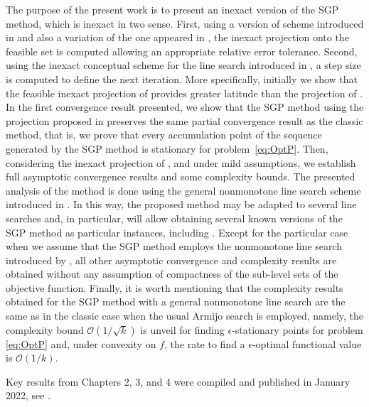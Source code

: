 The purpose of the present  work is to present an inexact version of the SGP method, which  is inexact in two sense. First,  using  a version of  scheme introduced in \cite{BirginMartinezRaydan2003} and also a variation of the one appeared in \cite[Example 1]{VillaSalzo2013},  the inexact projection  onto the feasible  set is computed  allowing an appropriate  relative error tolerance. Second,  using the inexact  conceptual scheme for the  line search  introduced  in  \cite{GrapigliaSachs2020, SachsSachs2011}, a step size is computed  to define the next iteration.   More specifically, initially we show that the  feasible inexact  projection of \cite{BirginMartinezRaydan2003} provides greater latitude than the projection of \cite[Example 1]{VillaSalzo2013}.  In the first  convergence result presented, we show that the SGP method using the projection proposed in \cite{BirginMartinezRaydan2003} preserves the same partial convergence result as the classic method, that is, we prove that every accumulation point  of the sequence generated by the SGP method is stationary for problem~\eqref{eq:OptP}. Then, considering the inexact projection of \cite[Example 1]{VillaSalzo2013}, and  under mild  assumptions,  we establish  full asymptotic convergence results  and  some complexity bounds. The  presented analysis of the method is done using the general  nonmonotone line search scheme  introduced in \cite{GrapigliaSachs2020}. In this way, the proposed method may be adapted to several line searches and, in particular, will allow obtaining several known versions of the SGP method as particular instances,  including  \cite{yunier_roman2010,BirginMartinezRaydan2003,Iusem2003,Xihong2018}. Except for the particular case when we assume that the SGP method employs  the nonmonotone line search introduced by \cite{Grippo1986}, all other  asymptotic convergence and complexity  results are obtained without any assumption of compactness of the sub-level sets of the objective function.  Finally, it is worth mentioning that the complexity results obtained  for the SGP method with a general nonmonotone line search  are the same as in the classic case when the usual Armijo search is employed, namely,  the complexity bound  $\mathcal{O}(1/\sqrt{k})$ is unveil for finding $\epsilon$-stationary points for problem \eqref{eq:OptP} and, under convexity on $f$, the rate to find a $\epsilon$-optimal functional value is $\mathcal{O}(1/k)$.

Key results from Chapters 2, 3, and 4 were compiled and published in January 2022, see \cite{FerreiraLemesPrudente2022}.


